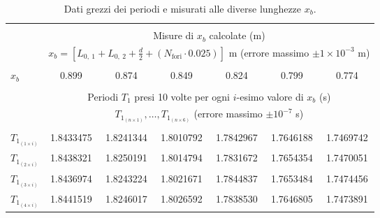 \begin{table*}[t!]
    \centering
    \caption{Dati grezzi dei periodi  e  misurati alle diverse lunghezze $x_b$.}
    \footnotesize
    \label{table:raw_data}
    \begin{tabular}{l*{6}{c}}
        \hline\hline\\[-1.5ex]
                               & \multicolumn{6}{c}{Misure di $x_b$ calcolate (m)}                                                        \\[+0.5ex] 
                               & \multicolumn{6}{c}{$x_b=\left[L_{0,~1} + L_{0,~2} + \frac{d}{2} + (N_{\text{fori}}\cdot0.025)\right]$ m (errore massimo $\pm1\times10^{-3}$ m)} 
                               \\[+0.5ex] \hline \\[-1.5ex]
        $x_b$                  & 0.899     & 0.874              & 0.849              & 0.824     & 0.799     & 0.774                      \\[+0.5ex] \hline \\[-1.5ex]
                               & \multicolumn{6}{c}{Periodi $T_1$ presi 10 volte per ogni $i$-esimo valore di $x_b$ (s)}                               \\[+0.5ex]
                               & \multicolumn{6}{c}{$T_{1_{(n \times 1)}}, \ldots, T_{1_{(n \times 6)}}$ (errore massimo $\pm10^{-7}$ s)} \\[+0.5ex] \hline \\[-1.5ex]
        $T_{1_{(1 \times i)}}$ & 1.8433475 & 1.8241344          & 1.8010792          & 1.7842967 & 1.7646188 & 1.7469742                  \\[+0.5ex]
        $T_{1_{(2 \times i)}}$ & 1.8438321 & 1.8250191          & 1.8014794          & 1.7831672 & 1.7654354 & 1.7470051                  \\[+0.5ex]
        $T_{1_{(3 \times i)}}$ & 1.8436974 & 1.8243224          & 1.8021671          & 1.7844837 & 1.7653484 & 1.7474456                  \\[+0.5ex]
        $T_{1_{(4 \times i)}}$ & 1.8441519 & 1.8246017          & 1.8026592          & 1.7838530 & 1.7646805 & 1.7473891                  \\[+0.5ex]

\end{tabular}
\end{table*}

